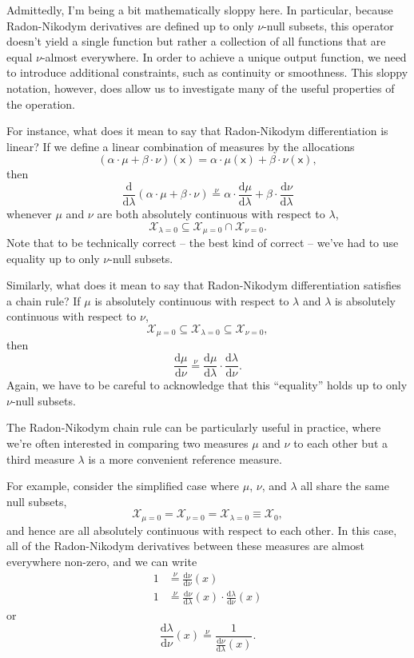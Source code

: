 \documentclass[
  letterpaper,
  DIV=11,
  numbers=noendperiod]{scrartcl}
\begin{document}
Admittedly, I'm being a bit mathematically sloppy here. In particular,
because Radon-Nikodym derivatives are defined up to only \(\nu\)-null
subsets, this operator doesn't yield a single function but rather a
collection of all functions that are equal \(\nu\)-almost everywhere. In
order to achieve a unique output function, we need to introduce
additional constraints, such as continuity or smoothness. This sloppy
notation, however, does allow us to investigate many of the useful
properties of the operation.

For instance, what does it mean to say that Radon-Nikodym
differentiation is linear? If we define a linear combination of measures
by the allocations \[
(\alpha \cdot \mu + \beta \cdot \nu)(\mathsf{x})
=
\alpha \cdot \mu(\mathsf{x}) + \beta \cdot \nu(\mathsf{x}),
\] then \[
\frac{ \mathrm{d} }{ \mathrm{d} \lambda }
(\alpha \cdot \mu + \beta \cdot \nu)
\overset{\nu}{=}
\alpha \cdot \frac{ \mathrm{d} \mu}{ \mathrm{d} \lambda }
+ \beta \cdot \frac{ \mathrm{d} \nu }{ \mathrm{d} \lambda }
\] whenever \(\mu\) and \(\nu\) are both absolutely continuous with
respect to \(\lambda\), \[
\mathcal{X}_{\lambda = 0} \subseteq
\mathcal{X}_{\mu = 0} \cap \mathcal{X}_{\nu = 0}.
\] Note that to be technically correct -- the best kind of correct --
we've had to use equality up to only \(\nu\)-null subsets.

Similarly, what does it mean to say that Radon-Nikodym differentiation
satisfies a chain rule? If \(\mu\) is absolutely continuous with respect
to \(\lambda\) and \(\lambda\) is absolutely continuous with respect to
\(\nu\), \[
\mathcal{X}_{\mu = 0}
\subseteq \mathcal{X}_{\lambda = 0}
\subseteq \mathcal{X}_{\nu = 0},
\] then \[
\frac{ \mathrm{d} \mu}{ \mathrm{d} \nu}
\overset{\nu}{=}
\frac{ \mathrm{d} \mu}{ \mathrm{d} \lambda } \cdot
\frac{ \mathrm{d} \lambda}{ \mathrm{d} \nu }.
\] Again, we have to be careful to acknowledge that this ``equality''
holds up to only \(\nu\)-null subsets.

The Radon-Nikodym chain rule can be particularly useful in practice,
where we're often interested in comparing two measures \(\mu\) and
\(\nu\) to each other but a third measure \(\lambda\) is a more
convenient reference measure.

For example, consider the simplified case where \(\mu\), \(\nu\), and
\(\lambda\) all share the same null subsets, \[
  \mathcal{X}_{\mu = 0}
= \mathcal{X}_{\nu = 0}
= \mathcal{X}_{\lambda = 0}
\equiv \mathcal{X}_{0},
\] and hence are all absolutely continuous with respect to each other.
In this case, all of the Radon-Nikodym derivatives between these
measures are almost everywhere non-zero, and we can write \begin{align*}
1
&\overset{\nu}{=}
\frac{ \mathrm{d} \nu}{ \mathrm{d} \nu}(x)
\\
1
&\overset{\nu}{=}
\frac{ \mathrm{d} \nu}{ \mathrm{d} \lambda }(x) \cdot
\frac{ \mathrm{d} \lambda}{ \mathrm{d} \nu }(x)
\end{align*} or \[
\frac{ \mathrm{d} \lambda}{ \mathrm{d} \nu }(x)
\overset{\nu}{=}
\frac{1}{ \frac{ \mathrm{d} \nu}{ \mathrm{d} \lambda }(x) }.
\]
\end{document}
